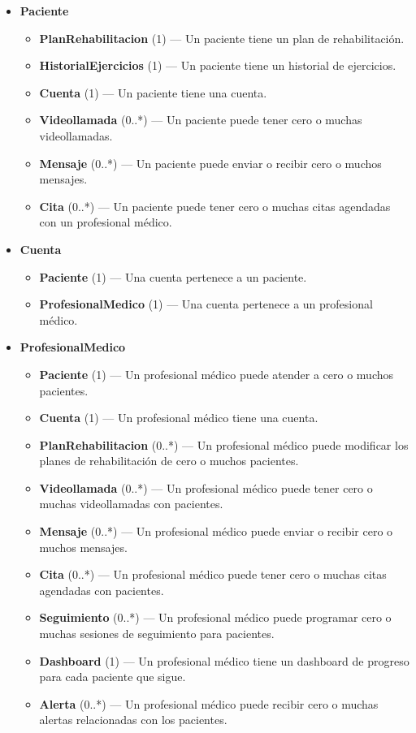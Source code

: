 \documentclass{article}
\begin{document}
\begin{itemize}
	\item \textbf{Paciente}
	\begin{itemize}
		\item \textbf{PlanRehabilitacion} (1) — Un paciente tiene un plan de rehabilitación.
		\item \textbf{HistorialEjercicios} (1) — Un paciente tiene un historial de ejercicios.
		\item \textbf{Cuenta} (1) — Un paciente tiene una cuenta.
		\item \textbf{Videollamada} (0..*) — Un paciente puede tener cero o muchas videollamadas.
		\item \textbf{Mensaje} (0..*) — Un paciente puede enviar o recibir cero o muchos mensajes.
		\item \textbf{Cita} (0..*) — Un paciente puede tener cero o muchas citas agendadas con un profesional médico.
	\end{itemize}
	
	\item \textbf{Cuenta}
	\begin{itemize}
		\item \textbf{Paciente} (1) — Una cuenta pertenece a un paciente.
		\item \textbf{ProfesionalMedico} (1) — Una cuenta pertenece a un profesional médico.
	\end{itemize}
	\item \textbf{ProfesionalMedico}
	\begin{itemize}
		\item \textbf{Paciente} (1) — Un profesional médico puede atender a cero o muchos pacientes.
		\item \textbf{Cuenta} (1) — Un profesional médico tiene una cuenta.
		\item \textbf{PlanRehabilitacion} (0..*) — Un profesional médico puede modificar los planes de rehabilitación de cero o muchos pacientes.
		\item \textbf{Videollamada} (0..*) — Un profesional médico puede tener cero o muchas videollamadas con pacientes.
		\item \textbf{Mensaje} (0..*) — Un profesional médico puede enviar o recibir cero o muchos mensajes.
		\item \textbf{Cita} (0..*) — Un profesional médico puede tener cero o muchas citas agendadas con pacientes.
		\item \textbf{Seguimiento} (0..*) — Un profesional médico puede programar cero o muchas sesiones de seguimiento para pacientes.
		\item \textbf{Dashboard} (1) — Un profesional médico tiene un dashboard de progreso para cada paciente que sigue.
		\item \textbf{Alerta} (0..*) — Un profesional médico puede recibir cero o muchas alertas relacionadas con los pacientes.
	\end{itemize}
	

\end{itemize}
\end{document}
